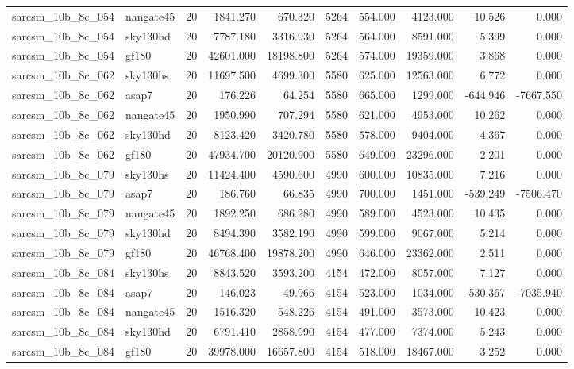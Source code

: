 \begin{tabular}{llrrrrrrrr}
sarcsm\_10b\_8c\_054 & nangate45 & 20 & 1841.270 & 670.320 & 5264 & 554.000 & 4123.000 & 10.526 & 0.000 \\
sarcsm\_10b\_8c\_054 & sky130hd & 20 & 7787.180 & 3316.930 & 5264 & 564.000 & 8591.000 & 5.399 & 0.000 \\
sarcsm\_10b\_8c\_054 & gf180 & 20 & 42601.000 & 18198.800 & 5264 & 574.000 & 19359.000 & 3.868 & 0.000 \\
sarcsm\_10b\_8c\_062 & sky130hs & 20 & 11697.500 & 4699.300 & 5580 & 625.000 & 12563.000 & 6.772 & 0.000 \\
sarcsm\_10b\_8c\_062 & asap7 & 20 & 176.226 & 64.254 & 5580 & 665.000 & 1299.000 & -644.946 & -7667.550 \\
sarcsm\_10b\_8c\_062 & nangate45 & 20 & 1950.990 & 707.294 & 5580 & 621.000 & 4953.000 & 10.262 & 0.000 \\
sarcsm\_10b\_8c\_062 & sky130hd & 20 & 8123.420 & 3420.780 & 5580 & 578.000 & 9404.000 & 4.367 & 0.000 \\
sarcsm\_10b\_8c\_062 & gf180 & 20 & 47934.700 & 20120.900 & 5580 & 649.000 & 23296.000 & 2.201 & 0.000 \\
sarcsm\_10b\_8c\_079 & sky130hs & 20 & 11424.400 & 4590.600 & 4990 & 600.000 & 10835.000 & 7.216 & 0.000 \\
sarcsm\_10b\_8c\_079 & asap7 & 20 & 186.760 & 66.835 & 4990 & 700.000 & 1451.000 & -539.249 & -7506.470 \\
sarcsm\_10b\_8c\_079 & nangate45 & 20 & 1892.250 & 686.280 & 4990 & 589.000 & 4523.000 & 10.435 & 0.000 \\
sarcsm\_10b\_8c\_079 & sky130hd & 20 & 8494.390 & 3582.190 & 4990 & 599.000 & 9067.000 & 5.214 & 0.000 \\
sarcsm\_10b\_8c\_079 & gf180 & 20 & 46768.400 & 19878.200 & 4990 & 646.000 & 23362.000 & 2.511 & 0.000 \\
sarcsm\_10b\_8c\_084 & sky130hs & 20 & 8843.520 & 3593.200 & 4154 & 472.000 & 8057.000 & 7.127 & 0.000 \\
sarcsm\_10b\_8c\_084 & asap7 & 20 & 146.023 & 49.966 & 4154 & 523.000 & 1034.000 & -530.367 & -7035.940 \\
sarcsm\_10b\_8c\_084 & nangate45 & 20 & 1516.320 & 548.226 & 4154 & 491.000 & 3573.000 & 10.423 & 0.000 \\
sarcsm\_10b\_8c\_084 & sky130hd & 20 & 6791.410 & 2858.990 & 4154 & 477.000 & 7374.000 & 5.243 & 0.000 \\
sarcsm\_10b\_8c\_084 & gf180 & 20 & 39978.000 & 16657.800 & 4154 & 518.000 & 18467.000 & 3.252 & 0.000 \\

\end{tabular}
